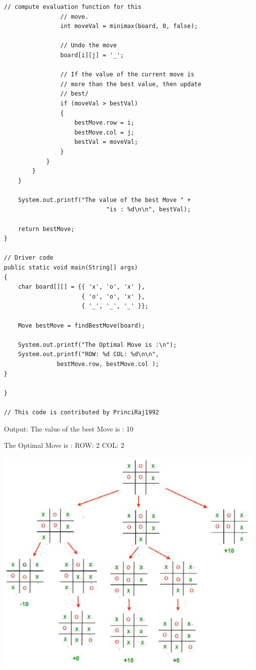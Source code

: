 \documentclass[uplatex,a4paper,11pt,oneside,openany]{jsbook}
\begin{document}
\begin{lstlisting}[caption=minimax003,label=prog001-3]
                // compute evaluation function for this
                // move.
                int moveVal = minimax(board, 0, false);

                // Undo the move
                board[i][j] = '_';

                // If the value of the current move is
                // more than the best value, then update
                // best/
                if (moveVal > bestVal)
                {
                    bestMove.row = i;
                    bestMove.col = j;
                    bestVal = moveVal;
                }
            }
        }
    }

    System.out.printf("The value of the best Move " +
                             "is : %d\n\n", bestVal);

    return bestMove;
}

// Driver code
public static void main(String[] args)
{
    char board[][] = {{ 'x', 'o', 'x' },
                      { 'o', 'o', 'x' },
                      { '_', '_', '_' }};

    Move bestMove = findBestMove(board);

    System.out.printf("The Optimal Move is :\n");
    System.out.printf("ROW: %d COL: %d\n\n",
               bestMove.row, bestMove.col );
}

}

// This code is contributed by PrinciRaj1992
\end{lstlisting}

\begin{itembox}[l]{Output:}
  The value of the best Move is : 10

  The Optimal Move is :
  ROW: 2 COL: 2
\end{itembox}



\begin{center}
  \includegraphics[width=0.8\hsize]{figures/eps/TIC_TAC.eps}
\end{center}
\end{document}
